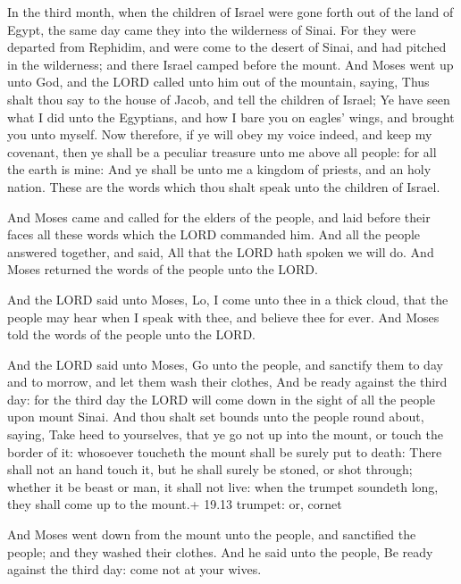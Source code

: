  In the third month, when the children of Israel were gone
forth out of the land of Egypt, the same day came they into the
wilderness of Sinai.  For they were departed from Rephidim,
and were come to the desert of Sinai, and had pitched in the wilderness;
and there Israel camped before the mount.  And Moses went up
unto God, and the LORD called unto him out of the mountain, saying, Thus
shalt thou say to the house of Jacob, and tell the children of Israel;
 Ye have seen what I did unto the Egyptians, and how I bare
you on eagles' wings, and brought you unto myself.  Now
therefore, if ye will obey my voice indeed, and keep my covenant, then
ye shall be a peculiar treasure unto me above all people: for all the
earth is mine:  And ye shall be unto me a kingdom of
priests, and an holy nation. These are the words which thou shalt speak
unto the children of Israel.

 And Moses came and called for the elders of the people,
and laid before their faces all these words which the LORD commanded
him.  And all the people answered together, and said, All
that the LORD hath spoken we will do. And Moses returned the words of
the people unto the LORD.

 And the LORD said unto Moses, Lo, I come unto thee in a
thick cloud, that the people may hear when I speak with thee, and
believe thee for ever. And Moses told the words of the people unto the
LORD.

 And the LORD said unto Moses, Go unto the people, and
sanctify them to day and to morrow, and let them wash their clothes,
 And be ready against the third day: for the third day the
LORD will come down in the sight of all the people upon mount Sinai.
 And thou shalt set bounds unto the people round about,
saying, Take heed to yourselves, that ye go not up into the mount, or
touch the border of it: whosoever toucheth the mount shall be surely put
to death:  There shall not an hand touch it, but he shall
surely be stoned, or shot through; whether it be beast or man, it shall
not live: when the trumpet soundeth long, they shall come up to the
mount.+ 19.13 trumpet: or, cornet

 And Moses went down from the mount unto the people, and
sanctified the people; and they washed their clothes.  And
he said unto the people, Be ready against the third day: come not at
your wives.

